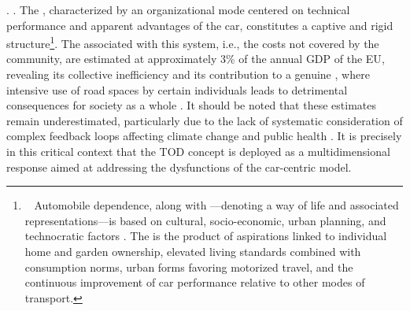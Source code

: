 \begin{refsegment}
{}. \textcolor{blue}{\autocites[62]{cervero_transit_1998}[4]{heran_reduction_2001}[2]{heran_zones_2009}}. The , characterized by an organizational mode centered on technical performance and apparent advantages of the car, constitutes a captive and rigid structure\footnote{~
    Automobile dependence, along with —denoting a way of life and associated representations—is based on cultural, socio-economic, urban planning, and technocratic factors \textcolor{blue}{\autocite[12]{heran_reduction_2001}}. The  is the product of aspirations linked to individual home and garden ownership, elevated living standards combined with consumption norms, urban forms favoring motorized travel, and the continuous improvement of car performance relative to other modes of transport.
}. The  associated with this system, i.e., the costs not covered by the community, are estimated at approximately 3\% of the annual \acrfull{GDP} of the \acrfull{EU}, revealing its collective inefficiency \textcolor{blue}{\autocite[34]{becker_couts_2012}} and its contribution to a genuine  \textcolor{blue}{\autocite{hardin_tragecommuns_1968}}, where intensive use of road spaces by certain individuals leads to detrimental consequences for society as a whole \textcolor{blue}{\autocite[23]{6t-bureau_de_recherche_livre_2019}}. It should be noted that these estimates remain underestimated, particularly due to the lack of systematic consideration of complex feedback loops affecting climate change and public health \textcolor{blue}{\autocite[66, 72]{gossling_social_2019}}. It is precisely in this critical context that the \acrshort{TOD} concept is deployed as a multidimensional response aimed at addressing the dysfunctions of the car-centric model.%


\end{refsegment}
